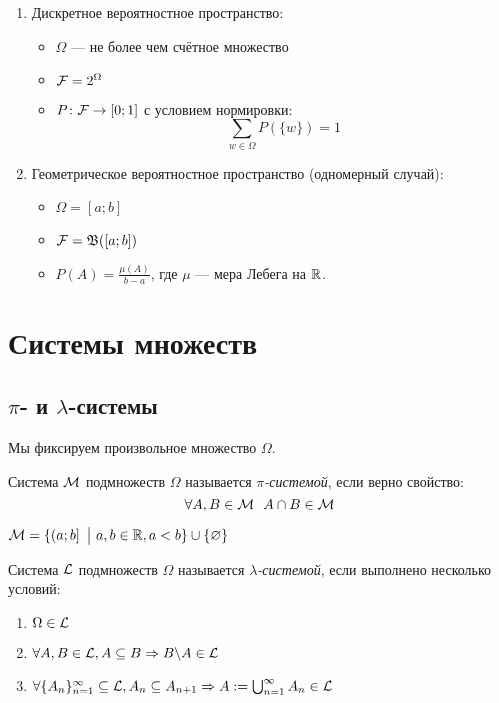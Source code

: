 \begin{enumerate}
	\item Дискретное вероятностное пространство:
	\begin{itemize}
		\item $\Omega$ --- не более чем счётное множество
		
		\item $\mathcal{F} = 2^\Omega$
		
		\item $P \colon \mathcal{F} \to [0; 1]$ с условием нормировки:
		\[
			\sum_{w \in \Omega} P(\{w\}) = 1
		\]
	\end{itemize}

	\item Геометрическое вероятностное пространство (одномерный случай):
	\begin{itemize}
		\item $\Omega = [a; b]$
		
		\item $\mathcal{F} = \mathfrak{B}([a; b])$
		
		\item $P(A) = \frac{\mu(A)}{b - a}$, где $\mu$ --- мера Лебега на $\mathbb{R}$.
	\end{itemize}
\end{enumerate}

\section{Системы множеств}

\subsection{$\pi$- и $\lambda$-системы}

\begin{note}
	Мы фиксируем произвольное множество $\Omega$.
\end{note}

\begin{definition}
	Система $\mathcal{M}$ подмножеств $\Omega$ называется \textit{$\pi$-системой}, если верно свойство:
	\[
		\forall A, B \in \cM\ \ A \cap B \in \cM
	\]
\end{definition}

\begin{example}
	$\mathcal{M} = \{\left(a; b\right] \ \big|\  a, b \in \mathbb{R}, a < b\} \cup \{\varnothing\}$
\end{example}

\begin{definition}
	Система $\mathcal{L}$ подмножеств $\Omega$ называется \textit{$\lambda$-системой}, если выполнено несколько условий:
	\begin{enumerate}
		\item $\Omega \in \mathcal{L}$
		
		\item $\forall A, B \in \mathcal{L}, A \subseteq B \Rightarrow B \backslash A \in \mathcal{L}$
		
		\item $\forall \{A_n\}_{n = 1}^\infty \subseteq \mathcal{L}, A_n \subseteq A_{n + 1} \Rightarrow A := \bigcup_{n = 1}^\infty A_n \in \mathcal{L}$
	\end{enumerate}
\end{definition}

